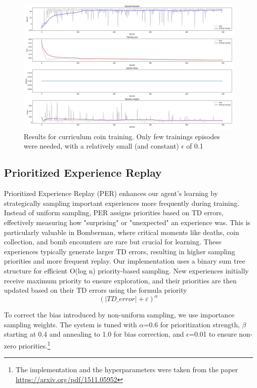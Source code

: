 \documentclass{article} %
\begin{document}
	\begin{figure}[h!]
		\centering
		\includegraphics[width=1.0\textwidth]{images/curriculum_coin}
		\caption{Results for curriculum coin training. Only few trainings episodes were needed, with a relatively small (and constant) $\epsilon$ of 0.1}
		\label{fig:3}
	\end{figure}
	
	\subsection{Prioritized Experience Replay}
	Prioritized Experience Replay (PER) enhances our agent's learning by strategically sampling important experiences more frequently during training. Instead of uniform sampling, PER assigns priorities based on TD errors, effectively measuring how "surprising" or "unexpected" an experience was. This is particularly valuable in Bomberman, where critical moments like deaths, coin collection, and bomb encounters are rare but crucial for learning. These experiences typically generate larger TD errors, resulting in higher sampling priorities and more frequent replay. Our implementation uses a binary sum tree structure for efficient O(log n) priority-based sampling. New experiences initially receive maximum priority to ensure exploration, and their priorities are then updated based on their TD errors using the formula priority
	\begin{equation}
		(|TD\_error| + \varepsilon)^{\alpha}
	\end{equation}
	
	To correct the bias introduced by non-uniform sampling, we use importance sampling weights. The system is tuned with $\alpha$=0.6 for prioritization strength, $\beta$ starting at 0.4 and annealing to 1.0 for bias correction, and $\epsilon$=0.01 to ensure non-zero priorities.\footnote{The implementation and the hyperparameters were taken from the paper \url{https://arxiv.org/pdf/1511.05952}}
	
\end{document}
